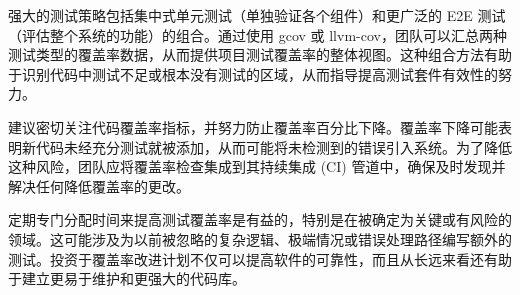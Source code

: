 强大的测试策略包括集中式单元测试（单独验证各个组件）和更广泛的 E2E 测试（评估整个系统的功能）的组合。通过使用 gcov 或 llvm-cov，团队可以汇总两种测试类型的覆盖率数据，从而提供项目测试覆盖率的整体视图。这种组合方法有助于识别代码中测试不足或根本没有测试的区域，从而指导提高测试套件有效性的努力。

建议密切关注代码覆盖率指标，并努力防止覆盖率百分比下降。覆盖率下降可能表明新代码未经充分测试就被添加，从而可能将未检测到的错误引入系统。为了降低这种风险，团队应将覆盖率检查集成到其持续集成 (CI) 管道中，确保及时发现并解决任何降低覆盖率的更改。

定期专门分配时间来提高测试覆盖率是有益的，特别是在被确定为关键或有风险的领域。这可能涉及为以前被忽略的复杂逻辑、极端情况或错误处理路径编写额外的测试。投资于覆盖率改进计划不仅可以提高软件的可靠性，而且从长远来看还有助于建立更易于维护和更强大的代码库。












